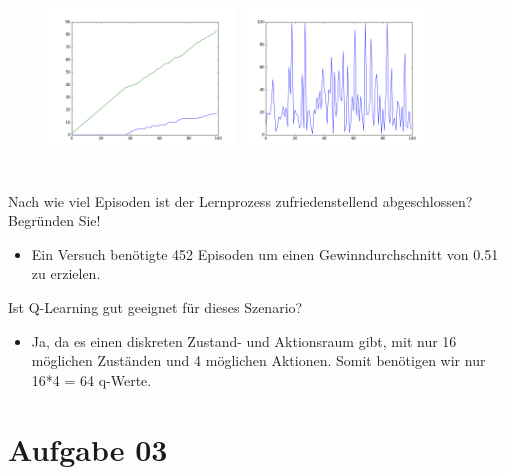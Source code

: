 \documentclass{ocbeameruni}
\begin{document}
\begin{frame}{2.3}
\begin{figure}[ht]
    \centering
    \includegraphics[width=50mm, height=50mm]{plots/figure_1.png} 
    \includegraphics[width=50mm, height=50mm]{plots/figure_2.png} 
\end{figure}
 
\end{frame}


\begin{frame}[2.4]
Nach wie viel Episoden ist der Lernprozess zufriedenstellend abgeschlossen? Begründen Sie!
\begin{itemize}
\item Ein Versuch benötigte 452 Episoden um einen Gewinndurchschnitt von 0.51 zu erzielen.
\end{itemize}
\end{frame}


\begin{frame}[2.5]
Ist Q-Learning gut geeignet für dieses Szenario?
\begin{itemize}
\item Ja, da es einen diskreten Zustand- und Aktionsraum gibt, mit nur 16 möglichen Zuständen und 4 möglichen Aktionen.
Somit benötigen wir nur 16*4 = 64 q-Werte.
\end{itemize}
\end{frame}

\section{Aufgabe 03}
\end{document}
